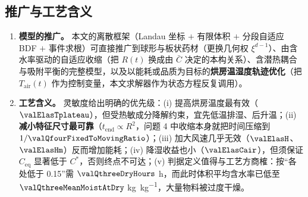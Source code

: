 \subsection{推广与工艺含义}
\begin{enumerate}[leftmargin=*,itemsep=0.2em]
  \item \textbf{模型的推广。} 本文的离散框架（Landau 坐标 $+$ 有限体积 $+$ 分段自适应 BDF $+$ 事件求根）可直接推广到球形与板状药材（更换几何权 $\xi^{d-1}$）、由含水率驱动的自适应收缩（把 $R(t)$ 换成由 $\bar C$ 决定的本构关系）、含潜热耦合与吸附平衡的完整模型，以及以能耗或品质为目标的\textbf{烘房温湿度轨迹优化}（把 $T_{\mathrm{air}}(t)$ 作为控制变量，本文求解器作为状态方程反复调用）。
  \item \textbf{工艺含义。} 灵敏度给出明确的优先级：(i) 提高烘房温度最有效（$\valElasTplateau$），但受热敏成分降解约束，宜先低温排湿、后升温；(ii) \textbf{减小特征尺寸最可靠}（$t_{\mathrm{end}}\propto R^2$，问题 4 中收缩本身就把时间压缩到 $1/\valQfourFixedToMovingRatio$）；(iii) 加大风速几乎无效（$\valElasH$、$\valElasHm$）反而增加能耗；(iv) 降湿收益也小（$\valElasCair$），但须保证 $C_{\mathrm{eq}}$ 显著低于 $C^\ast$，否则终点不可达；(v) 判据定义值得与工艺方商榷：按“各处低于 0.15”需 $\valQthreeDryHours$ h，而此时体积平均含水率已低至 $\valQthreeMeanMoistAtDry$ \si{\kilo\gram\per\kilo\gram}，大量物料被过度干燥。
\end{enumerate}
